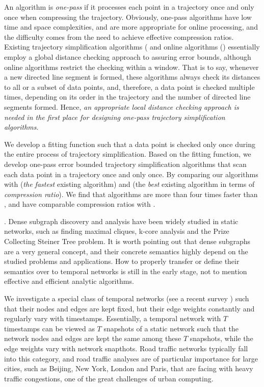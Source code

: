 An \lsa algorithm is {\em one-pass} if it processes each point in a trajectory once and only once when compressing the trajectory.
Obviously, one-pass algorithms have low time and space complexities, and are more appropriate for online processing, and
the difficulty comes from the need to achieve effective compression ratios.
Existing trajectory simplification algorithms (\eg \cite{Douglas:Peucker} and online algorithms  (\eg \cite{Liu:BQS}) essentially employ a global distance checking approach to assuring error bounds, although online algorithms restrict the checking within a window. That is to say, whenever a new directed line segment is formed, these algorithms always check its distances to all or a subset of data points, and, therefore, a data point is checked multiple times, depending on its order in the trajectory and the number of directed line segments formed. Hence, {\em an appropriate local distance checking approach is needed in the first place for designing one-pass trajectory simplification algorithms}.
 
 We develop a  fitting function such that a data point is checked only once during the entire process of trajectory simplification. Based on the fitting function, we develop one-pass error bounded trajectory simplification algorithms that scan each data point in a trajectory once and only once. By comparing our algorithms with \fbqsa (\emph{the fastest} existing \lsa algorithm) and \dpa (the {\em best} existing \lsa algorithm in terms of {\em compression ratio}). We find that algorithms are more than four times faster than \fbqsa, and have  comparable compression ratios with \dpa.


. Dense subgraph discovery and analysis have been widely studied in static networks, such as  finding maximal cliques, k-core analysis and  the Prize Collecting Steiner Tree problem. It is worth pointing out that dense subgraphs are a very general concept, and their concrete semantics highly depend on the studied problems and applications. How to properly transfer or define their semantics over to temporal networks is still in the early stage, not to mention effective and efficient analytic algorithms.

We investigate a special class of temporal networks (see a recent survey \cite{tn-survey}) such that their nodes and edges are kept fixed, but their edge weights constantly and regularly vary with timestamps. Essentially, a temporal network with $T$ timestamps can be viewed as $T$ snapshots of a static network such that the network nodes and edges are kept the same among these $T$ snapshots, while the edge weights vary with network snapthots.
%
Road traffic networks typically fall into this category, and  road traffic analyses are of particular importance for large cities, such as Beijing, New York, London and Paris, that are facing with heavy traffic congestions, one of the great challenges of urban computing.

